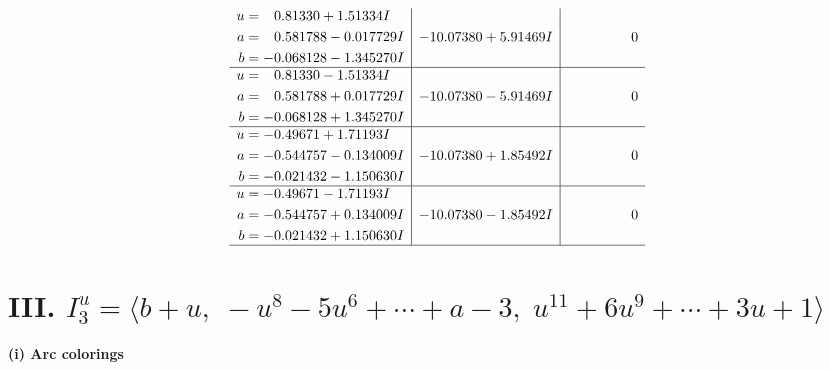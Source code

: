 \documentclass[1p]{elsarticle_modified}
\theoremstyle{definition}
\begin{document}
$$\begin{array}{c|c|c}
\begin{aligned}
u &= \phantom{-}0.81330 + 1.51334 I \\
a &= \phantom{-}0.581788 - 0.017729 I \\
b &= -0.068128 - 1.345270 I\end{aligned}
 & -10.07380 + 5.91469 I & \phantom{-0.000000 } 0 \\ \hline\begin{aligned}
u &= \phantom{-}0.81330 - 1.51334 I \\
a &= \phantom{-}0.581788 + 0.017729 I \\
b &= -0.068128 + 1.345270 I\end{aligned}
 & -10.07380 - 5.91469 I & \phantom{-0.000000 } 0 \\ \hline\begin{aligned}
u &= -0.49671 + 1.71193 I \\
a &= -0.544757 - 0.134009 I \\
b &= -0.021432 - 1.150630 I\end{aligned}
 & -10.07380 + 1.85492 I & \phantom{-0.000000 } 0 \\ \hline\begin{aligned}
u &= -0.49671 - 1.71193 I \\
a &= -0.544757 + 0.134009 I \\
b &= -0.021432 + 1.150630 I\end{aligned}
 & -10.07380 - 1.85492 I & \phantom{-0.000000 } 0\\
 \hline 
 \end{array}$$\newpage\newpage\renewcommand{\arraystretch}{1}
\centering \section*{III. $I^u_{3}= \langle b+u,\;- u^8-5 u^6+\cdots+a-3,\;u^{11}+6 u^9+\cdots+3 u+1 \rangle$}
\flushleft \textbf{(i) Arc colorings}\\
\end{document}
